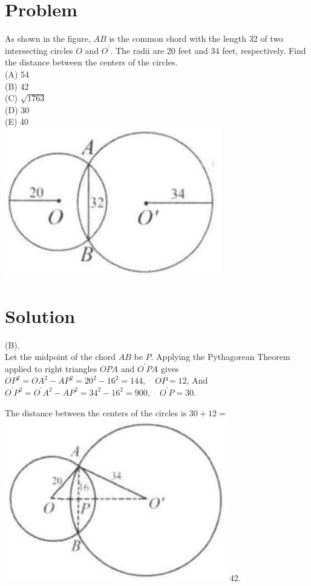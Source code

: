 \documentclass{article}
\begin{document}
\section*{Problem}
As shown in the figure, \(A B\) is the common chord with the length 32 of two intersecting circles \(O\) and \(O^{\prime}\). The radii are 20 feet and 34 feet, respectively. Find the distance between the centers of the circles.\\
(A) 54\\
(B) 42\\
(C) \(\sqrt{1763}\)\\
(D) 30\\
(E) 40\\
\centering
\includegraphics[width=\textwidth]{images/184(1).jpg}

\section*{Solution}
(B).\\
Let the midpoint of the chord \(A B\) be \(P\). Applying the Pythagorean Theorem applied to right triangles \(O P A\) and \(O^{\prime} P A\) gives\\
\(O P^{2}=O A^{2}-A P^{2}=20^{2}-16^{2}=144, \quad O P=12\), And \(O^{\prime} P^{2}=O^{\prime} A^{2}-A P^{2}=34^{2}-16^{2}=900, \quad O^{\prime} P=30\).

The distance between the centers of the circles is \(30+12=\)\\
\includegraphics[width=\textwidth]{images/188(1).jpg} 42.
\end{document}
